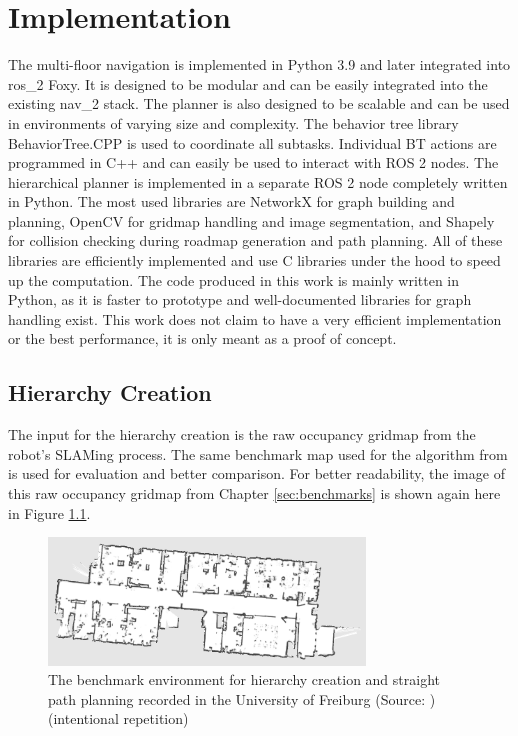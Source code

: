 \chapter{Implementation}
\label{sec:implementation}
The multi-floor navigation is implemented in Python 3.9 and later integrated into \gls{ros_2} Foxy. It is designed to be modular and can be easily integrated into the existing \gls{nav_2} stack. The planner is also designed to be scalable and can be used in environments of varying size and complexity. The behavior tree library BehaviorTree.CPP \cite{auryn_robotics_behaviortreecpp_2023} is used to coordinate all subtasks. Individual BT actions are programmed in C++ and can easily be used to interact with ROS 2 nodes. The hierarchical planner is implemented in a separate ROS 2 node completely written in Python. The most used libraries are NetworkX for graph building and planning, OpenCV for gridmap handling and image segmentation, and Shapely for collision checking during roadmap generation and path planning. All of these libraries are efficiently implemented and use C libraries under the hood to speed up the computation. The code produced in this work is mainly written in Python, as it is faster to prototype and well-documented libraries for graph handling exist. This work does not claim to have a very efficient implementation or the best performance, it is only meant as a proof of concept.

\section{Hierarchy Creation}
\label{sec:hierarchy_creation}
The input for the hierarchy creation is the raw occupancy gridmap from the robot's SLAMing process. The same benchmark map used for the algorithm from \cite{ryu_hierarchical_2020} is used for evaluation and better comparison. For better readability, the image of this raw occupancy gridmap from Chapter \ref{sec:benchmarks} is shown again here in Figure \ref{fig:freiburg_benchmark_2}.

\begin{figure}[h]
    \centering
    \includegraphics[width=0.75\textwidth]{figures/30_methods/freiburg_benchmark.png}
    \caption[The benchmark environment for hierarchy creation and straight path planning (intentional repetition)]{The benchmark environment for hierarchy creation and straight path planning recorded in the University of Freiburg (Source: \cite{cyrill_stachniss_robotics_2015})(intentional repetition)}
    \label{fig:freiburg_benchmark_2}
\end{figure}

